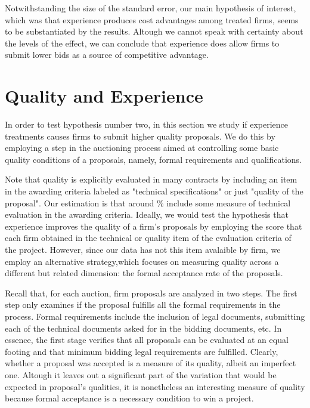 

Notwithstanding the size of the standard error, our main hypothesis of interest, which was that experience produces cost advantages among treated firms, seems to be substantiated by the results. Altough we cannot speak with certainty about the levels of the effect, we can conclude that experience does allow firms to submit lower bids as a source of competitive advantage.


\section{Quality and Experience}
In order to test hypothesis number two, in this section we study if experience treatments causes firms to submit higher quality proposals. We do this by employing a step in the auctioning process aimed at controlling some basic quality conditions of a proposals, namely, formal requirements and qualifications.

Note that quality is explicitly evaluated in many contracts by including an item in the awarding criteria labeled as "technical specifications" or just "quality of the proposal". Our estimation is that around \% include some measure of technical evaluation in the awarding criteria.  Ideally, we would test the hypothesis that experience improves the quality of a firm's proposals by employing the score that each firm obtained in the technical or quality item of the evaluation criteria of the project. However, since our data has not this item avalaible by firm, we employ an alternative strategy,which focuses on measuring quality across a different but related dimension: the formal acceptance rate of the proposals.

Recall that, for each auction, firm proposals are analyzed in two steps. The first step only examines if the proposal fulfills all the formal requirements in the process. Formal requirements include the inclusion of legal documents, submitting each of the technical documents asked for in the bidding documents, etc. In essence, the first stage verifies that all proposals can be evaluated at an equal footing and that minimum bidding legal requirements are fulfilled. Clearly, whether a proposal was accepted is a measure of its quality, albeit an imperfect one. Altough it leaves out a significant part of the variation that would be expected in proposal's qualities, it is nonetheless an interesting measure of quality because formal acceptance is a necessary condition to win a project.

